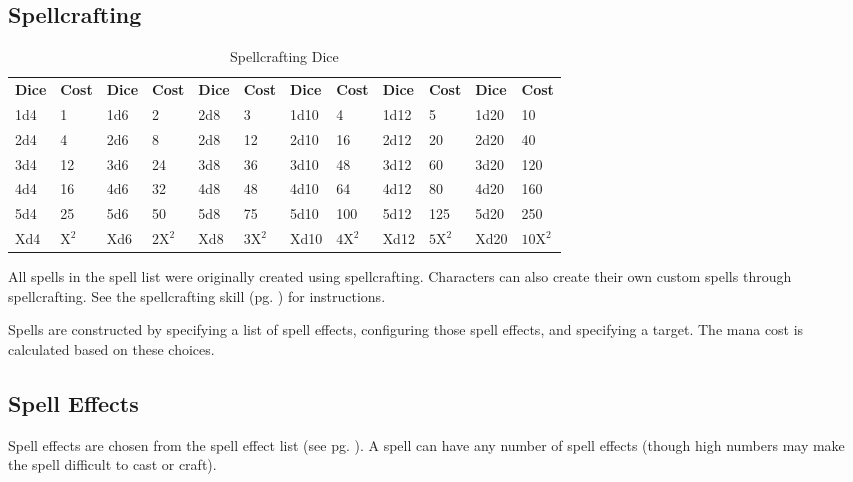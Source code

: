 
\begin{multicols*}{2}
    \section{Spellcrafting}
    \begin{table*}[ht]
        \unclassedrowcolors
        \begin{tabularx}{\textwidth}{X X X X X X X X X X X X}
            \textbf{Dice} & \textbf{Cost} & \textbf{Dice} & \textbf{Cost} & \textbf{Dice} & \textbf{Cost} & \textbf{Dice} & \textbf{Cost} & \textbf{Dice} & \textbf{Cost} & \textbf{Dice} & \textbf{Cost} \\
            1d4 & 1   & 1d6 & 2    & 2d8 & 3    & 1d10 & 4    & 1d12 & 5    & 1d20 & 10    \\
            2d4 & 4   & 2d6 & 8    & 2d8 & 12   & 2d10 & 16   & 2d12 & 20   & 2d20 & 40    \\
            3d4 & 12  & 3d6 & 24   & 3d8 & 36   & 3d10 & 48   & 3d12 & 60   & 3d20 & 120   \\
            4d4 & 16  & 4d6 & 32   & 4d8 & 48   & 4d10 & 64   & 4d12 & 80   & 4d20 & 160   \\
            5d4 & 25  & 5d6 & 50   & 5d8 & 75   & 5d10 & 100  & 5d12 & 125  & 5d20 & 250   \\
            Xd4 & $\text{X}^\text{2}$ & Xd6 & $\text{2X}^\text{2}$ & Xd8 & $\text{3X}^\text{2}$ & Xd10 & $\text{4X}^\text{2}$ & Xd12 & $\text{5X}^\text{2}$ & Xd20 & $\text{10X}^\text{2}$ \\
        \end{tabularx}
        \caption{Spellcrafting Dice}
        \label{tab:spellcrafting-dice}
    \end{table*}

    All spells in the spell list were originally created using spellcrafting.
    Characters can also create their own custom spells through spellcrafting.
    See the spellcrafting skill (pg. \pageref{skill:spellcrafting}) for
    instructions.

    Spells are constructed by specifying a list of spell effects, configuring
    those spell effects, and specifying a target. The mana cost is calculated
    based on these choices.

    \subsection{Spell Effects}
    Spell effects are chosen from the spell effect list (see pg.
    \pageref{spell-effect-list}). A spell can have any number of spell effects
    (though high numbers may make the spell difficult to cast or craft).


\end{multicols*}
